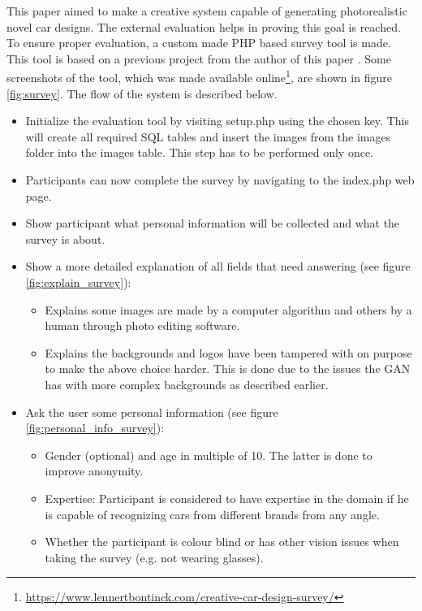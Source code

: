 This paper aimed to make a creative system capable of generating photorealistic novel car designs.
The external evaluation helps in proving this goal is reached.
To ensure proper evaluation, a custom made PHP based survey tool is made.
This tool is based on a previous project from the author of this paper \citep{bapproef}.
Some screenshots of the tool, which was made available online\footnote{\url{https://www.lennertbontinck.com/creative-car-design-survey/}}, are shown in figure \ref{fig:survey}.
The flow of the system is described below.
\begin{itemize}
    \item Initialize the evaluation tool by visiting setup.php using the chosen key. This will create all required SQL tables and insert the images from the images folder into the images table. This step has to be performed only once.
    \item Participants can now complete the survey by navigating to the index.php web page.
    \item Show participant what personal information will be collected and what the survey is about.
    \item Show a more detailed explanation of all fields that need answering (see figure \ref{fig:explain_survey}):
    \begin{itemize}
        \item Explains some images are made by a computer algorithm and others by a human through photo editing software.
        \item Explains the backgrounds and logos have been tampered with on purpose to make the above choice harder. This is done due to the issues the GAN has with more complex backgrounds as described earlier.
    \end{itemize}
    \item Ask the user some personal information (see figure \ref{fig:personal_info_survey}):
    \begin{itemize}
        \item Gender (optional) and age in multiple of 10. The latter is done to improve anonymity. 
        \item Expertise: Participant is considered to have expertise in the domain if he is capable of recognizing cars from different brands from any angle.
        \item Whether the participant is colour blind or has other vision issues when taking the survey (e.g. not wearing glasses).
    \end{itemize}

\end{itemize}
